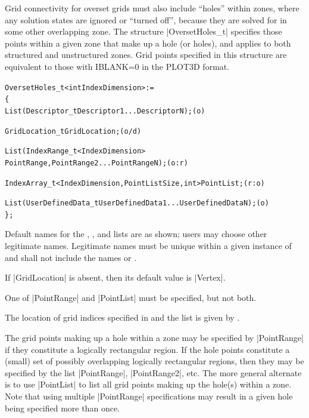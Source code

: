 Grid connectivity for overset grids must also include ``holes'' within zones,
where any solution states are ignored or ``turned off'', because they are
solved for in some other overlapping zone.  The structure |OversetHoles_t|
specifies those points within a given zone that make up a hole (or holes),
and applies to both structured and unstructured zones.
Grid points specified in this structure are equivalent to those with
IBLANK=0 in the PLOT3D format.

\begin{alltt}
  OversetHoles\_t< int IndexDimension > :=
    \{
    List( Descriptor\_t Descriptor1 ... DescriptorN ) ;                      (o)

    GridLocation\_t GridLocation ;                                           (o/d)

    List( IndexRange\_t<IndexDimension> 
      PointRange, PointRange2 ... PointRangeN ) ;                           (o:r)

    IndexArray\_t<IndexDimension, PointListSize, int> PointList ;            (r:o)

    List( UserDefinedData\_t UserDefinedData1 ... UserDefinedDataN ) ;       (o)
    \} ;
\end{alltt}

\begin{notes}
\item
 Default names for the , , and
 lists are as shown; users may choose other legitimate names.
 Legitimate names must be unique 
 within a given instance of  and shall not include the
 names  or .
\item
 If |GridLocation| is absent, then its default value is |Vertex|.
\item
 One of |PointRange| and |PointList| must be specified, but not both.
\end{notes}

The location of grid indices specified in  and the
 list is given by .

The grid points making up a hole within a zone may be specified by
|PointRange| if they constitute a logically rectangular region.  If the hole
points constitute a (small) set of possibly overlapping logically rectangular
regions, then they may be specified by the list |PointRange|, |PointRange2|,
etc.  The more general alternate is to use |PointList| to list all grid
points making up the hole(s) within a zone.
Note that using multiple |PointRange| specifications may result in a
given hole being specified more than once.

